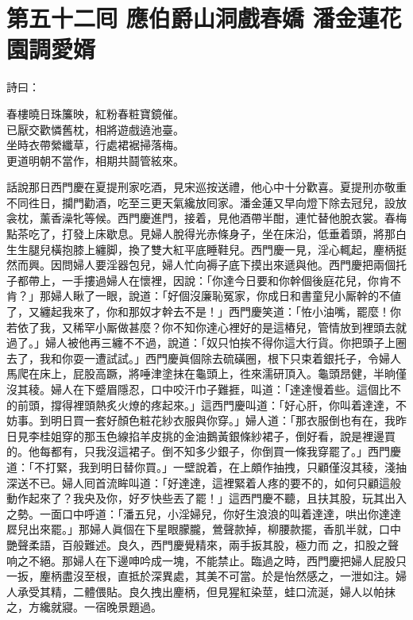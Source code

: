 
\chapter*{第五十二囘 應伯爵山洞戲春嬌 潘金蓮花園調愛婿}


詩曰：

\begin{myquote} 
春樓曉日珠簾映，紅粉春粧寶鏡催。\\已厭交歡憐舊枕，相將遊戲遶池臺。\\坐時衣帶縈纖草，行處裙裾掃落梅。\\更道明朝不當作，相期共鬪管絃來。
\end{myquote} 

話說那日西門慶在夏提刑家吃酒，見宋巡按送禮，他心中十分歡喜。夏提刑亦敬重不同徃日，{}攔門勸酒，吃至三更天氣纔放囘家。潘金蓮又早向燈下除去冠兒，設放衾枕，薰香澡牝等候。西門慶進門，接着，見他酒帶半酣，連忙替他脫衣裳。春梅點茶吃了，打發上床歇息。見婦人脫得光赤條身子，坐在床沿，低垂着頭，將那白生生腿兒橫抱膝上纏脚，{}換了雙大紅平底睡鞋兒。西門慶一見，淫心輒起，麈柄挺然而興。因問婦人要淫器包兒，婦人忙向褥子底下摸出來遞與他。西門慶把兩個托子都帶上，一手摟過婦人在懷裡，因說：「你達今日要和你幹個後庭花兒，你肯不肯？」那婦人瞅了一眼，說道：「好個沒廉恥冤家，你成日和書童兒小厮幹的不値了，又纏起我來了，你和那奴才幹去不是！」西門慶笑道：「恠小油嘴，罷麼！你若依了我，又稀罕小厮做甚麼？你不知你達心裡好的是這樁兒，管情放到裡頭去就過了。」{}婦人被他再三纏不不過，說道：「奴只怕挨不得你這大行貨。你把頭子上圈去了，我和你耍一遭試試。」西門慶眞個除去硫磺圈，根下只束着銀托子，令婦人馬爬在床上，屁股高蹶，將唾津塗抹在龜頭上，徃來濡研頂入。龜頭昂健，半晌僅沒其稜。婦人在下蹙眉隱忍，口中咬汗巾子難捱，叫道：「達達慢着些。這個比不的前頭，撐得裡頭熱炙火燎的疼起來。」這西門慶叫道：「好心肝，你叫着達達，不妨事。到明日買一套好顏色粧花紗衣服與你穿。」婦人道：「那衣服倒也有在，我昨日見李桂姐穿的那玉色線掐羊皮挑的金油鵝黃銀條紗裙子，倒好看，說是裡邊買的。他每都有，只我沒這裙子。倒不知多少銀子，你倒買一條我穿罷了。」西門慶道：「不打緊，我到明日替你買。」一壁說着，在上頗作抽拽，只顧僅沒其稜，淺抽深送不已。婦人囘首流眸叫道：「好達達，這裡緊着人疼的要不的，如何只顧這般動作起來了？我央及你，好歹快些丟了罷！」這西門慶不聽，且扶其股，玩其出入之勢。一面口中呼道：「潘五兒，小淫婦兒，你好生浪浪的叫着達達，哄出你達達㞞兒出來罷。」那婦人眞個在下星眼朦朧，鶯聲款掉，柳腰款擺，香肌半就，口中艷聲柔語，百般難述。良久，西門慶覺精來，兩手扳其股，極力而𢵞之，扣股之聲响之不絕。那婦人在下邊呻吟成一塊，不能禁止。臨過之時，西門慶把婦人屁股只一扳，麈柄盡沒至根，直抵於深異處，其美不可當。於是怡然感之，一泄如注。婦人承受其精，二體偎貼。良久拽出麈柄，但見猩紅染莖，蛙口流涎，婦人以帕抹之，方纔就寢。一宿晚景題過。


